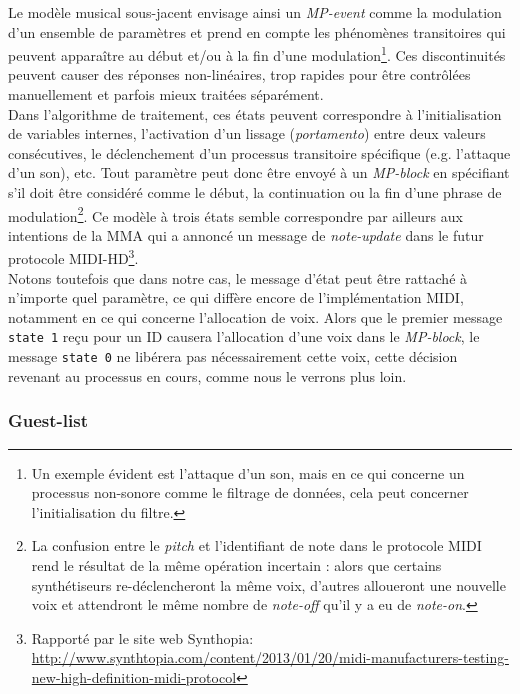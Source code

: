 \noindent Le modèle musical sous-jacent envisage ainsi un \textit{MP-event} comme la modulation d'un ensemble de paramètres et prend en compte les phénomènes transitoires qui peuvent apparaître au début et/ou à la fin d'une modulation\footnote{ Un exemple évident est l'attaque d'un son, mais en ce qui concerne un processus non-sonore comme le filtrage de données, cela peut concerner l'initialisation du filtre.}. Ces discontinuités peuvent causer des réponses non-linéaires, trop rapides pour être contrôlées manuellement et parfois mieux traitées séparément.\\
\indent Dans l'algorithme de traitement, ces états peuvent correspondre à l'initialisation de variables internes, l'activation d'un lissage (\textit{portamento}) entre deux valeurs consécutives, le déclenchement d'un processus transitoire spécifique (e.g. l'attaque d'un son), etc. Tout paramètre peut donc être envoyé à un \textit{MP-block} en spécifiant s'il doit être considéré comme le début, la continuation ou la fin d'une phrase de modulation\footnote{ La confusion entre le \textit{pitch} et l'identifiant de note dans le protocole \gls{MIDI} rend le résultat de la même opération incertain : alors que certains synthétiseurs re-déclencheront la même voix, d'autres alloueront une nouvelle voix et attendront le même nombre de \textit{note-off} qu'il y a eu de \textit{note-on}.}. Ce modèle à trois états semble correspondre par ailleurs aux intentions de la \gls{MMA} qui a annoncé un message de \textit{note-update} dans le futur protocole MIDI-HD\footnote{Rapporté par le site web Synthopia: \url{http://www.synthtopia.com/content/2013/01/20/midi-manufacturers-testing-new-high-definition-midi-protocol}}.\\
\indent Notons toutefois que dans notre cas, le message d'état peut être rattaché à n'importe quel paramètre, ce qui diffère encore de l'implémentation \gls{MIDI}, notamment en ce qui concerne l'allocation de voix. Alors que le premier message \verb|state 1| reçu pour un ID causera l'allocation d'une voix dans le \textit{MP-block}, le message \verb|state 0| ne libérera pas nécessairement cette voix, cette décision revenant au processus en cours, comme nous le verrons plus loin.

\subsubsection{Guest-list}

